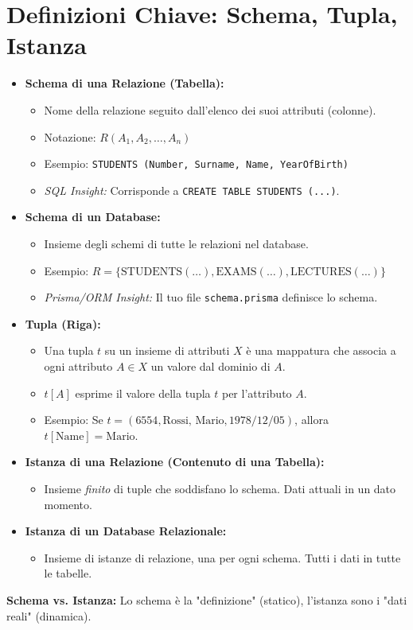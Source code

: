 \documentclass{article}
\begin{document}
	\section{Definizioni Chiave: Schema, Tupla, Istanza}
	\begin{itemize}
		\item \textbf{Schema di una Relazione (Tabella):}
		\begin{itemize}
			\item Nome della relazione seguito dall'elenco dei suoi attributi (colonne).
			\item Notazione: $R(A_1, A_2, \dots, A_n)$
			\item Esempio: \texttt{STUDENTS (Number, Surname, Name, YearOfBirth)}
			\item \textit{SQL Insight:} Corrisponde a \texttt{CREATE TABLE STUDENTS (...)}.
		\end{itemize}
		\item \textbf{Schema di un Database:}
		\begin{itemize}
			\item Insieme degli schemi di tutte le relazioni nel database.
			\item Esempio: $R = \{\text{STUDENTS}(\dots), \text{EXAMS}(\dots), \text{LECTURES}(\dots)\}$
			\item \textit{Prisma/ORM Insight:} Il tuo file \texttt{schema.prisma} definisce lo schema.
		\end{itemize}
		\item \textbf{Tupla (Riga):}
		\begin{itemize}
			\item Una tupla $t$ su un insieme di attributi $X$ è una mappatura che associa a ogni attributo $A \in X$ un valore dal dominio di $A$.
			\item $t[A]$ esprime il valore della tupla $t$ per l'attributo $A$.
			\item Esempio: Se $t = (6554, \text{Rossi, Mario}, 1978/12/05)$, allora $t[\text{Name}] = \text{Mario}$.
		\end{itemize}
		\item \textbf{Istanza di una Relazione (Contenuto di una Tabella):}
		\begin{itemize}
			\item Insieme \textit{finito} di tuple che soddisfano lo schema. Dati attuali in un dato momento.
		\end{itemize}
		\item \textbf{Istanza di un Database Relazionale:}
		\begin{itemize}
			\item Insieme di istanze di relazione, una per ogni schema. Tutti i dati in tutte le tabelle.
		\end{itemize}
	\end{itemize}
	\textbf{Schema vs. Istanza:} Lo schema è la "definizione" (statico), l'istanza sono i "dati reali" (dinamica).
	
\end{document}
